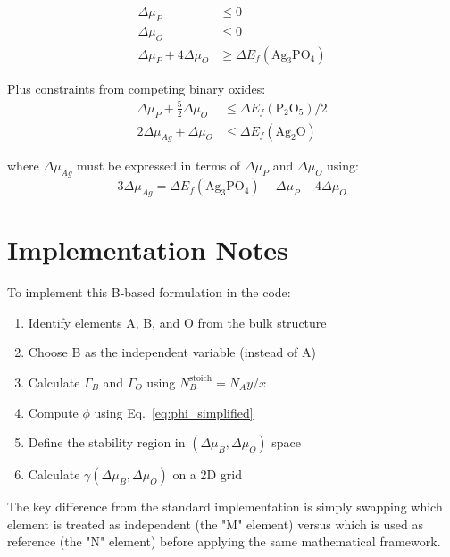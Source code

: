 \documentclass[11pt]{article}
\begin{document}
\begin{align}
\Delta\mu_P &\leq 0 \\
\Delta\mu_O &\leq 0 \\
\Delta\mu_P + 4 \Delta\mu_O &\geq \Delta E_f(\text{Ag}_3\text{PO}_4)
\end{align}

Plus constraints from competing binary oxides:
\begin{align}
\Delta\mu_P + \frac{5}{2} \Delta\mu_O &\leq \Delta E_f(\text{P}_2\text{O}_5) / 2 \\
2 \Delta\mu_{Ag} + \Delta\mu_O &\leq \Delta E_f(\text{Ag}_2\text{O})
\end{align}

where $\Delta\mu_{Ag}$ must be expressed in terms of $\Delta\mu_P$ and $\Delta\mu_O$ using:
\begin{equation}
3 \Delta\mu_{Ag} = \Delta E_f(\text{Ag}_3\text{PO}_4) - \Delta\mu_P - 4 \Delta\mu_O
\end{equation}

\section{Implementation Notes}

To implement this B-based formulation in the code:

\begin{enumerate}
\item Identify elements A, B, and O from the bulk structure
\item Choose B as the independent variable (instead of A)
\item Calculate $\Gamma_B$ and $\Gamma_O$ using $N_B^{\text{stoich}} = N_A y / x$
\item Compute $\phi$ using Eq.~\ref{eq:phi_simplified}
\item Define the stability region in $(\Delta\mu_B, \Delta\mu_O)$ space
\item Calculate $\gamma(\Delta\mu_B, \Delta\mu_O)$ on a 2D grid
\end{enumerate}

The key difference from the standard implementation is simply swapping which element is treated as independent (the "M" element) versus which is used as reference (the "N" element) before applying the same mathematical framework.
\end{document}
